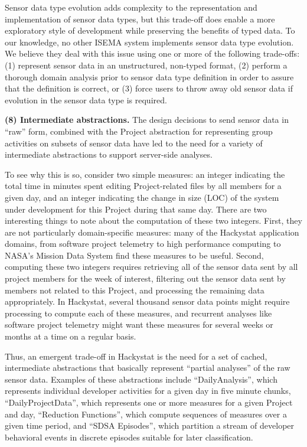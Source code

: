 \documentclass[10pt,twocolumn]{article}
\begin{document}
Sensor data type evolution adds complexity to the representation and
implementation of sensor data types, but this trade-off does enable a more
exploratory style of development while preserving the benefits of typed
data.  To our knowledge, no other ISEMA system implements sensor data type
evolution. We believe they deal with this issue using one or more of the
following trade-offs: (1) represent sensor data in an unstructured, non-typed
format, (2) perform a thorough domain analysis prior to sensor data type
definition in order to assure that the definition is correct, or (3) force
users to throw away old sensor data if evolution in the sensor data type is
required.

{\bf (8) Intermediate abstractions.} The design decisions to send sensor data
in ``raw'' form, combined with the Project abstraction for representing
group activities on subsets of sensor data have led to the need for a
variety of intermediate abstractions to support server-side analyses.

To see why this is so, consider two simple measures: an integer indicating
the total time in minutes spent editing Project-related files by all
members for a given day, and an integer indicating the change in size (LOC)
of the system under development for this Project during that same day.
There are two interesting things to note about the computation of these two
integers. First, they are not particularly domain-specific measures: many
of the Hackystat application domains, from software project telemetry to
high performance computing to NASA's Mission Data System find these
measures to be useful. Second, computing these two integers requires
retrieving all of the sensor data sent by all project members for the week
of interest, filtering out the sensor data sent by members not related to
this Project, and processing the remaining data appropriately. In
Hackystat, several thousand sensor data points might require processing to
compute each of these measures, and recurrent analyses like software
project telemetry might want these measures for several weeks or months at
a time on a regular basis.

Thus, an emergent trade-off in Hackystat is the need for a set of cached, 
intermediate abstractions that basically represent ``partial analyses'' of
the raw sensor data.   Examples of these abstractions include ``DailyAnalysis'', which 
represents individual developer activities for a given day in five minute chunks,
``DailyProjectData'', which represents one or more measures for a given Project
and day, ``Reduction Functions'', which compute sequences of measures over a given
time period, and ``SDSA Episodes'', which partition a stream of developer behavioral
events in discrete episodes suitable for later classification. 
\end{document}
